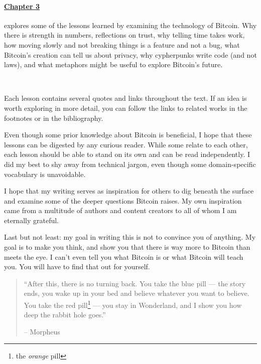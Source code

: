 \paragraph{\hyperref[ch:technology]{Chapter 3}}{ explores some of the lessons
learned by examining the technology of Bitcoin.  Why there is strength in
numbers, reflections on trust, why telling time takes work, how moving slowly
and not breaking things is a feature and not a bug, what Bitcoin's creation can
tell us about privacy, why cypherpunks write code (and not laws), and what
metaphors might be useful to explore Bitcoin's future.}

~

Each lesson contains several quotes and links throughout the text. If an idea is
worth exploring in more detail, you can follow the links to related works in the
footnotes or in the bibliography.

Even though some prior knowledge about Bitcoin is beneficial, I hope that these
lessons can be digested by any curious reader. While some relate to each other,
each lesson should be able to stand on its own and can be read independently. I
did my best to shy away from technical jargon, even though some domain-specific
vocabulary is unavoidable.

I hope that my writing serves as inspiration for others to dig beneath the
surface and examine some of the deeper questions Bitcoin raises. My own
inspiration came from a multitude of authors and content creators to all of whom
I am eternally grateful.

Last but not least: my goal in writing this is not to convince you of anything.
My goal is to make you think, and show you that there is way more to Bitcoin
than meets the eye. I can’t even tell you what Bitcoin is or what Bitcoin will
teach you. You will have to find that out for yourself.

\begin{quotation}\begin{samepage}
\enquote{After this, there is no turning back. You take the blue pill --- the
story ends, you wake up in your bed and believe whatever you want to
believe. You take the red pill\footnote{the \textit{orange} pill} --- you stay in Wonderland, and I show
you how deep the rabbit hole goes.}
\begin{flushright} -- Morpheus
\end{flushright}\end{samepage}\end{quotation}

